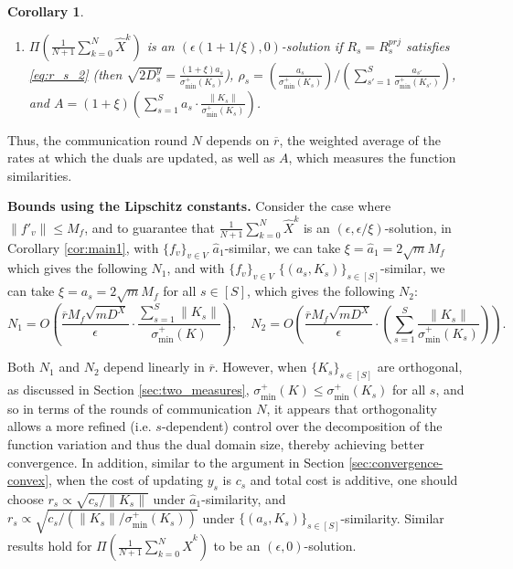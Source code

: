 \documentclass[10pt]{article}
\newtheorem{corollary}{Corollary}[section]
\begin{document}
\begin{corollary}
\begin{enumerate}
\begin{enumerate}
\item $\Pi(\frac{1}{N+1}\sum_{k=0}^N \widehat{X}^k)$ is an $(\epsilon(1+1/\xi),0)$-solution if $R_s = R_s^{prj}$ satisfies \eqref{eq:r_s_2} (then $\sqrt{2D_s^y}=\frac{(1+\xi )a_s}{\sigma_{\min}^+(K_s)}$), $\rho_s = (\frac{ a_s}{\sigma^+_{\min}(K_s)})/(\sum_{s'=1}^S \frac{ a_{s'}}{\sigma^+_{\min}(K_{s'})})$, and $A=(1+\xi)(\sum_{s=1}^S a_s\cdot \frac{\|K_s\|}{\sigma_{\min}^+(K_s)})$. 
\end{enumerate}
\end{enumerate}

\end{corollary}



Thus, the communication round $N$ depends on $\overline{r}$, the weighted average of the rates at which the duals are updated, as well as $A$, which measures the function similarities.  

\textbf{Bounds using the Lipschitz constants.}
Consider the case where $\|f'_v\|\leq M_f$, and to guarantee that $\frac{1}{N+1}\sum_{k=0}^N \widehat{X}^k$ is an $(\epsilon,\epsilon/\xi)$-solution, in Corollary \ref{cor:main1}, with $\{f_v\}_{v\in V}$ $\widehat{a}_1$-similar, we can take $\xi = \widehat{a}_1= 2\sqrt{m}M_f$ which gives the following $N_1$, and with $\{f_v\}_{v\in V}$ $\{(a_s,K_s)\}_{s\in [S]}$-similar, we can take $\xi = a_s = 2\sqrt{m}M_f$ for all $s\in [S]$, which gives the following $N_2$:
\begin{displaymath}
    N_1 = O(\frac{\overline{r}  M_f \sqrt{mD^X}}{\epsilon }\cdot \frac{\sum_{s=1}^S \|K_s\|}{\sigma_{\min}^+(K)}),\quad N_2 =O( \frac{\overline{r} M_f\sqrt{mD^X}}{\epsilon }\cdot (\sum_{s=1}^S \frac{\|K_s\|}{\sigma_{\min}^+(K_s)})).
\end{displaymath}


Both $N_1$ and $N_2$ depend linearly in $\overline{r}$. However, when $\{K_s\}_{s\in [S]}$ are orthogonal, as discussed in Section \ref{sec:two_measures}, 
$\sigma_{\min}^+(K)\leq \sigma_{\min}^+(K_s)$ for all $s$, and so in terms of the rounds of communication $N$, it appears that orthogonality allows a more refined (i.e. $s$-dependent) control over the decomposition of the function variation and thus the dual domain size, thereby achieving better convergence. In addition, similar to the argument in Section \ref{sec:convergence-convex}, when the cost of updating $y_s$ is $c_s$ and total cost is additive, one should choose $r_s \propto \sqrt{c_s/\|K_s\|}$ under $\widehat{a}_1$-similarity, and $r_s\propto \sqrt{c_s/(\|K_s\|/\sigma_{\min}^+(K_s))}$ under $\{(a_s,K_s)\}_{s\in [S]}$-similarity. Similar results hold for $\Pi(\frac{1}{N+1}\sum_{k=0}^N \widehat{X}^k) $ to be an $(\epsilon,0)$-solution. 
\end{document}
